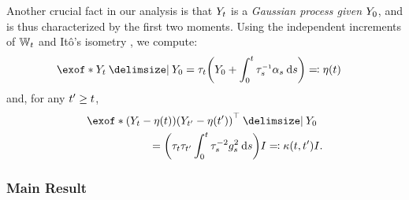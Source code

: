 Another crucial fact in our analysis is that $\refsde$ is a \emph{Gaussian process given $\refsde[0]$}, and is thus characterized by the first two moments. Using the independent increments of $\Wiener$ and It\^o's isometry \citep{protter2005stochastic}, we compute:
\begin{align}
\label{eq:mYdef}
\exof*{  \refsde \given \refsde[0]  } &= \aggtime  \parens*{\refsde[0] +  \int_0^\ctime {\aggtimeinv[\ctimealt]}{ \shift[\ctimealt] } \dd \ctimealt  } \eqdef \mYcinit  
\end{align}and, for any $\ctime' \geq \ctime$, 
\begin{align}
\label{eq:covYdef}
&\exof*{  \parens*{ \refsde - \mYcinit  } \parens*{ \refsde[\ctime']- \mYcinit[\ctime']   }^\top \given \refsde[0] } \\
&\hspace{20mm}= \parens*{\aggtime \aggtime[\ctime'] \intdasq} \eye \eqdef \kernel \eye.
\nn
\end{align}


\subsubsection{Main Result}%
\label{sec:GaussianSB-main}


